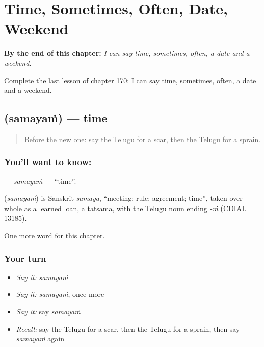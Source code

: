 
\chapter{Time, Sometimes, Often, Date, Weekend}
\label{ch:te-time-sometimes-often-date-weekend}

\begin{chapteropening}
\textbf{By the end of this chapter:} \emph{I can say time, sometimes, often, a date and a weekend.}

Complete the last lesson of chapter 170: I can say time, sometimes, often, a date and a weekend.
\end{chapteropening}

\section[\texorpdfstring{\te{సమయం} (samayaṁ)}{సమయం (samayaṁ)}]{ (samayaṁ) — time}

\label{lesson:TE-C170-samayam}



\begin{quote}
Before the new one: say the Telugu for a scar, then the Telugu for a sprain.
\end{quote}

\subsection*{You'll want to know: }
\textbf{} — \emph{samayaṁ} — \textquotedblleft{}time\textquotedblright{}.

\begin{cousinweb}
\textbf{} (\emph{samayaṁ}) is Sanskrit \emph{samaya}, \textquotedblleft{}meeting; rule; agreement; time\textquotedblright{}, taken over whole as a learned loan, a tatsama, with the Telugu noun ending \emph{-ṁ} (CDIAL 13185).
\end{cousinweb}

\begin{grammarlens}[title={What you've built}]
One more word for this chapter.
\end{grammarlens}

\subsection*{Your turn}
\begin{itemize}
\raggedright
  \item \emph{Say it:} \emph{samayaṁ}
  \item \emph{Say it:} \emph{samayaṁ}, once more
  \item \emph{Say it:} say \emph{samayaṁ}
  \item \emph{Recall:} say the Telugu for a scar, then the Telugu for a sprain, then say \emph{samayaṁ} again
\end{itemize}

